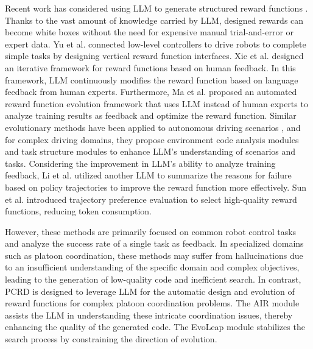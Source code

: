 \documentclass[lettersize,journal]{IEEEtran}
\begin{document}
Recent work has considered using LLM to generate structured reward functions \cite{yu2023language,maeureka,li2024auto,xietext2reward,han2024autoreward}. 
Thanks to the vast amount of knowledge carried by LLM, designed rewards can become white boxes without the need for expensive manual trial-and-error or expert data.
Yu et al. \cite{yu2023language} connected low-level controllers to drive robots to complete simple tasks by designing vertical reward function interfaces.
Xie et al. \cite{xietext2reward} designed an iterative framework for reward functions based on human feedback. In this framework, LLM continuously modifies the reward function based on language feedback from human experts.
Furthermore, Ma et al. \cite{maeureka} proposed an automated reward function evolution framework that uses LLM instead of human experts to analyze training results as feedback and optimize the reward function.
Similar evolutionary methods have been applied to autonomous driving scenarios \cite{han2024autoreward}, and for complex driving domains, they propose environment code analysis modules and task structure modules to enhance LLM's understanding of scenarios and tasks.
Considering the improvement in LLM's ability to analyze training feedback, Li et al. \cite{li2024auto} utilized another LLM to summarize the reasons for failure based on policy trajectories to improve the reward function more effectively.
Sun et al. \cite{sun2024large} introduced trajectory preference evaluation to select high-quality reward functions, reducing token consumption.

However, these methods are primarily focused on common robot control tasks and analyze the success rate of a single task as feedback.
In specialized domains such as platoon coordination, these methods may suffer from hallucinations due to an insufficient understanding of the specific domain and complex objectives, leading to the generation of low-quality code and inefficient search.
In contrast, PCRD is designed to leverage LLM for the automatic design and evolution of reward functions for complex platoon coordination problems. 
The AIR module assists the LLM in understanding these intricate coordination issues, thereby enhancing the quality of the generated code. 
The EvoLeap module stabilizes the search process by constraining the direction of evolution.
\end{document}
